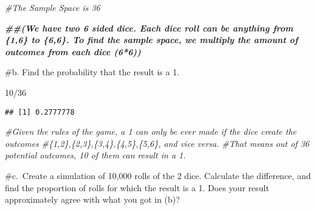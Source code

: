 \documentclass[
]{article}
\newenvironment{Shaded}{\begin{snugshade}}{\end{snugshade}}
\newcommand{\CommentTok}[1]{\textcolor[rgb]{0.56,0.35,0.01}{\textit{#1}}}
\newcommand{\DecValTok}[1]{\textcolor[rgb]{0.00,0.00,0.81}{#1}}
\newcommand{\DocumentationTok}[1]{\textcolor[rgb]{0.56,0.35,0.01}{\textbf{\textit{#1}}}}
\newcommand{\SpecialCharTok}[1]{\textcolor[rgb]{0.00,0.00,0.00}{#1}}
\begin{document}
\begin{Shaded}
\begin{Highlighting}[]
\CommentTok{\#The Sample Space is 36}

\DocumentationTok{\#\#(We have two 6 sided dice. Each dice roll can be anything from \{1,6\} to \{6,6\}. To find the sample space, we multiply the amount of outcomes from each dice (6*6))}
\end{Highlighting}
\end{Shaded}

\#b. Find the probability that the result is a 1.

\begin{Shaded}
\begin{Highlighting}[]
\DecValTok{10}\SpecialCharTok{/}\DecValTok{36}
\end{Highlighting}
\end{Shaded}

\begin{verbatim}
## [1] 0.2777778
\end{verbatim}

\begin{Shaded}
\begin{Highlighting}[]
\CommentTok{\#Given the rules of the game, a 1 can only be ever made if the dice create the outcomes }
\CommentTok{\#\{1,2\},\{2,3\},\{3,4\},\{4,5\},\{5,6\}, and vice versa.}
\CommentTok{\#That means out of 36 potential outcomes, 10 of them can result in a 1.}
\end{Highlighting}
\end{Shaded}

\#c.~Create a simulation of 10,000 rolls of the 2 dice. Calculate the
difference, and find the proportion of rolls for which the result is a
1. Does your result approximately agree with what you got in (b)?
\end{document}
